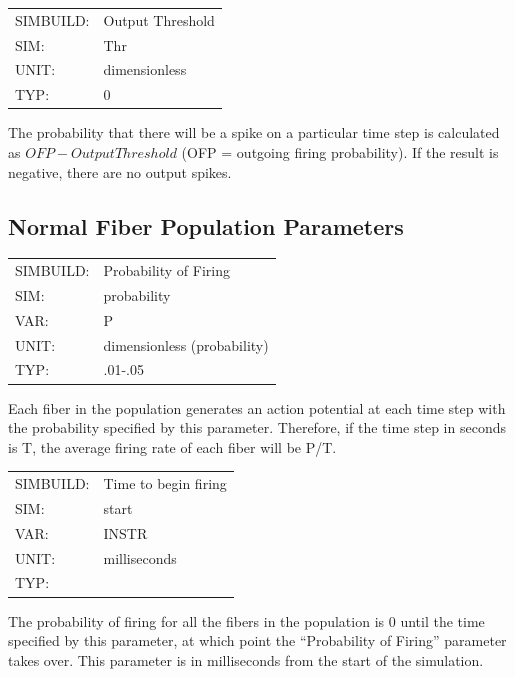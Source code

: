 \documentclass[12pt,openany,oneside]{book}
\newcommand{\inquotes}[1]{{{``#1''}}}
\begin{document}
\begin{flushleft}
\begin{tabular}{@{}ll@{}}
SIMBUILD: & Output Threshold\\
SIM: & Thr\\
UNIT: & dimensionless\\
TYP: & 0\\
\end{tabular}
\end{flushleft}
\noindent
The probability that there will be a spike on a particular time step
is calculated as $OFP - OutputThreshold$ (OFP = outgoing firing probability).
If the result is negative, there are no output spikes.
\filbreak
\vspace{\baselineskip}

\subsection{Normal Fiber Population Parameters}
\label{Normal Fiber Parameters}
\begin{flushleft}
\begin{tabular}{@{}ll@{}}
SIMBUILD: & Probability of Firing\\
SIM: & probability\\
VAR: & P\\
UNIT: & dimensionless (probability)\\
TYP: & .01-.05\\
\end{tabular}
\end{flushleft}
\noindent
Each fiber in the population generates an action potential at each
time step with the probability specified by this parameter.
Therefore, if the time step in seconds is T, the average firing rate
of each fiber will be P/T.
\filbreak
\vspace{\baselineskip}

\begin{flushleft}
\begin{tabular}{@{}ll@{}}
SIMBUILD: & Time to begin firing\\
SIM: & start\\
VAR: & INSTR\\
UNIT: & milliseconds\\
TYP: &\\
\end{tabular}
\end{flushleft}
\noindent
The probability of firing for all the fibers in the population is 0
until the time specified by this parameter, at which point the
\inquotes{Probability of Firing} parameter takes over. This parameter is in
milliseconds from the start of the simulation.
\filbreak
\vspace{\baselineskip}
\end{document}
